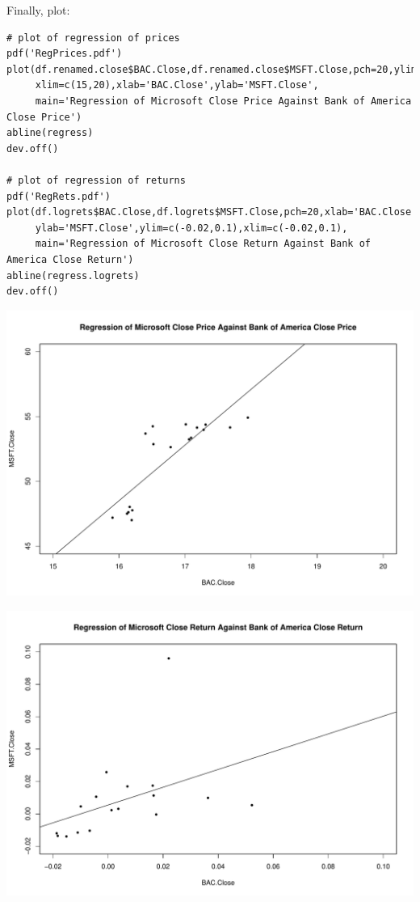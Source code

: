 \documentclass[paper=a4, fontsize=11pt]{scrartcl} %
\numberwithin{equation}{section} %
\numberwithin{figure}{section} %
\numberwithin{table}{section} %
\begin{document}
Finally, plot:

\begin{verbatim}
# plot of regression of prices
pdf('RegPrices.pdf')
plot(df.renamed.close$BAC.Close,df.renamed.close$MSFT.Close,pch=20,ylim=c(45,60),
     xlim=c(15,20),xlab='BAC.Close',ylab='MSFT.Close',
     main='Regression of Microsoft Close Price Against Bank of America Close Price')
abline(regress)
dev.off()

# plot of regression of returns
pdf('RegRets.pdf')
plot(df.logrets$BAC.Close,df.logrets$MSFT.Close,pch=20,xlab='BAC.Close',
     ylab='MSFT.Close',ylim=c(-0.02,0.1),xlim=c(-0.02,0.1),
     main='Regression of Microsoft Close Return Against Bank of America Close Return')
abline(regress.logrets)
dev.off()
\end{verbatim}

\includegraphics[scale=0.6]{RegPrices.pdf}\centering

\raggedright

\includegraphics[scale=0.6]{RegRets.pdf}\centering

\raggedright

\end{document}
